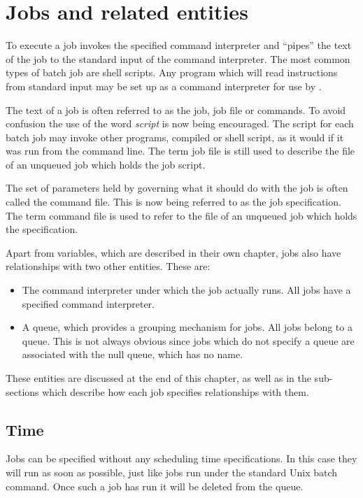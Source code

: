 \chapter{Jobs and related entities}
\label{chp:jobs-and-related-entities}
To execute a job \ProductName{} invokes the specified command interpreter and
``pipes'' the text of the job to the standard input of the command interpreter. The most common types of batch job
are shell scripts. Any program which will read instructions from standard input may be set up as a command interpreter for use by
\ProductName{}.

The text of a job is often referred to as the job, job file or commands. To avoid confusion the use of the word \textit{script} is now being
encouraged. The script for each batch job may invoke other programs, compiled or shell script, as it would if it was run from the command
line. The term job file is still used to describe the file of an unqueued job which holds the job script.

The set of parameters held by \ProductName{} governing what it should do with the job is often called the command file. This is now being referred to
as the job specification. The term command file is used to refer to the file of an unqueued job which holds the specification.

Apart from variables, which are described in their own chapter, jobs also have relationships with two other entities. These are:

\begin{itemize}
\item The command interpreter under which the job actually runs. All jobs have a specified command interpreter.
\item A queue, which provides a grouping mechanism for jobs. All jobs belong to a queue. This is not always obvious since jobs which do not
specify a queue are associated with the null queue, which has no name.
\end{itemize}
These entities are discussed at the end of this chapter, as well as in the sub-sections which describe how each job specifies relationships
with them.

\section{Time}
Jobs can be specified without any scheduling time specifications. In this case they will run as soon as possible, just like jobs run under
the standard Unix batch command. Once such a job has run it will be deleted from the queue.


